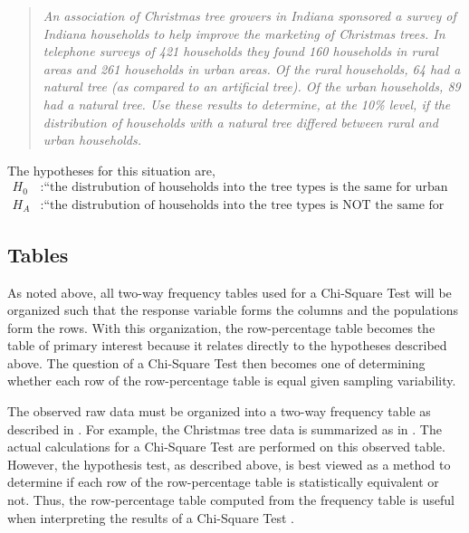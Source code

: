 \documentclass[10pt,openany]{book}\usepackage[]{graphicx}\usepackage[]{color}
\begin{document}
\vspace{-12pt}
\begin{quote}
\textsl{An association of Christmas tree growers in Indiana sponsored a survey of Indiana households to help improve the marketing of Christmas trees.  In telephone surveys of 421 households they found 160 households in rural areas and 261 households in urban areas.  Of the rural households, 64 had a natural tree (as compared to an artificial tree).  Of the urban households, 89 had a natural tree.  Use these results to determine, at the 10\% level, if the distribution of households with a natural tree differed between rural and urban households.}
\end{quote}

The hypotheses for this situation are,
\[ \begin{split}
  H_{0}&: \text{``the distrubution of households into the tree types is the same for urban and rural households''} \\
  H_{A}&: \text{``the distrubution of households into the tree types is NOT the same for urban and rural households''}
\end{split} \]


\subsection{Tables}
\vspace{-12pt}
As noted above, all two-way frequency tables used for a Chi-Square Test will be organized such that the response variable forms the columns and the populations form the rows.  With this organization, the row-percentage table becomes the table of primary interest because it relates directly to the hypotheses described above.  The question of a Chi-Square Test then becomes one of determining whether each row of the row-percentage table is equal given sampling variability.


The observed raw data must be organized into a two-way frequency table as described in .  For example, the Christmas tree data is summarized as in .  The actual calculations for a Chi-Square Test are performed on this observed table.  However, the hypothesis test, as described above, is best viewed as a method to determine if each row of the row-percentage table is statistically equivalent or not.  Thus, the row-percentage table computed from the frequency table is useful when interpreting the results of a Chi-Square Test .
\end{document}
